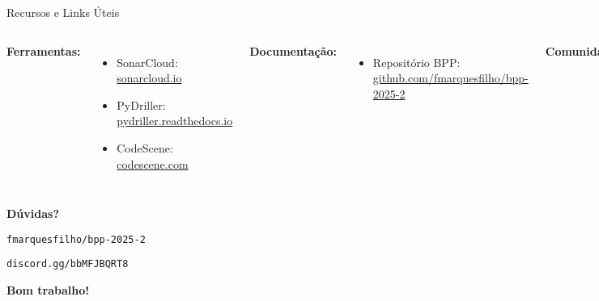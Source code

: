 \documentclass[aspectratio=169,11pt]{beamer}
\begin{document}
\begin{frame}{Recursos e Links Úteis}
\begin{columns}[T]
\textbf{Ferramentas:}
\begin{itemize}
    \item SonarCloud: \url{sonarcloud.io}
    \item PyDriller: \url{pydriller.readthedocs.io}
    \item CodeScene: \url{codescene.com}
\end{itemize}

\textbf{Documentação:}
\begin{itemize}
    \item Repositório BPP: \url{github.com/fmarquesfilho/bpp-2025-2}
\end{itemize}

\textbf{Comunidade:}
\begin{itemize}
    \item Discord: \url{discord.gg/bbMFJBQRT8}
\end{itemize}

\textbf{Referências:}
\begin{itemize}
    \item Awesome MSR
    \item Catálogo de Code Smells
\end{itemize}
\end{columns}
\end{frame}

\begin{frame}[standout]
\begin{center}
\Huge
\textbf{Dúvidas?}

\vspace{1cm}

\Large
{} \texttt{fmarquesfilho/bpp-2025-2}

\vspace{0.5cm}

 \texttt{discord.gg/bbMFJBQRT8}

\vspace{1cm}

\normalsize
\textbf{Bom trabalho!}
\end{center}
\end{frame}
\end{document}
